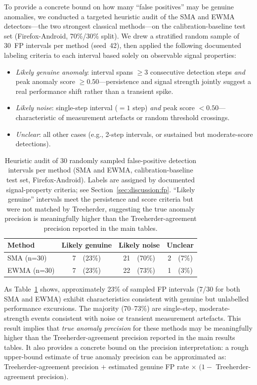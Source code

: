 \documentclass[a4paper,fleqn]{cas-sc}
\theoremstyle{plain}
\begin{document}
To provide a concrete bound on how many ``false positives'' may be
genuine anomalies, we conducted a targeted heuristic audit of the SMA and
EWMA detectors---the two strongest classical methods---on the
calibration-baseline test set (Firefox-Android, 70\%/30\% split).
We drew a stratified random sample of 30~FP intervals per method
(seed~42), then applied the following documented labeling criteria to
each interval based solely on observable signal properties:
\begin{itemize}
  \item \emph{Likely genuine anomaly}: interval spans $\geq 3$
    consecutive detection steps \emph{and} peak anomaly score
    $\geq 0.50$---persistence and signal strength jointly suggest
    a real performance shift rather than a transient spike.
  \item \emph{Likely noise}: single-step interval ($= 1$ step)
    \emph{and} peak score $< 0.50$---characteristic of measurement
    artefacts or random threshold crossings.
  \item \emph{Unclear}: all other cases (e.g., 2-step intervals,
    or sustained but moderate-score detections).
\end{itemize}

\begin{table}[tbp]
\centering
\begin{tabular}{lccc}
\toprule
Method & Likely genuine & Likely noise & Unclear \\
\midrule
SMA  (n=30) & 7~~(23\%) & 21~~(70\%) & 2~~(7\%) \\
EWMA (n=30) & 7~~(23\%) & 22~~(73\%) & 1~~(3\%) \\
\bottomrule
\end{tabular}
\caption{Heuristic audit of 30 randomly sampled false-positive detection
  intervals per method (SMA and EWMA, calibration-baseline test set,
  Firefox-Android). Labels are assigned by documented signal-property
  criteria; see Section~\ref{sec:discussion:fp}.
  ``Likely genuine'' intervals meet the persistence and score criteria
  but were not matched by Treeherder, suggesting the true anomaly
  precision is meaningfully higher than the Treeherder-agreement
  precision reported in the main tables.}
\label{tab:fp_audit}
\end{table}

As Table~\ref{tab:fp_audit} shows, approximately 23\% of sampled
FP intervals (7/30 for both SMA and EWMA) exhibit characteristics
consistent with genuine but unlabelled performance excursions.
The majority (70--73\%) are single-step, moderate-strength events
consistent with noise or transient measurement artefacts.
This result implies that \emph{true anomaly precision} for these methods
may be meaningfully higher than the Treeherder-agreement precision
reported in the main results tables.
It also provides a concrete bound on the precision interpretation:
a rough upper-bound estimate of true anomaly precision can be
approximated as: Treeherder-agreement precision $+$ estimated genuine
FP rate $\times$ $(1 - $ Treeherder-agreement precision$)$.
\end{document}
